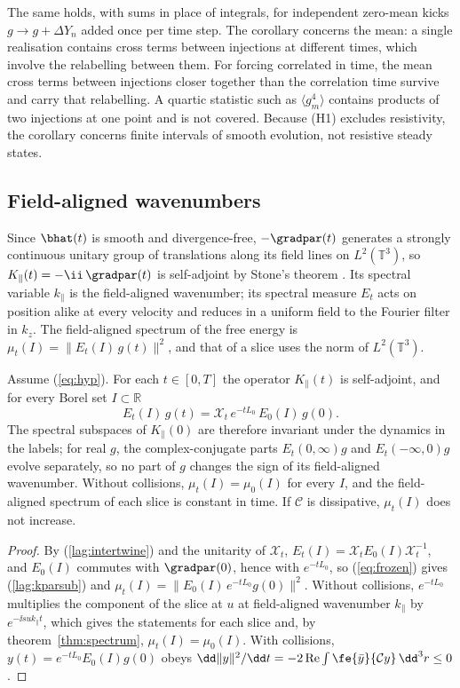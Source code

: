 The same holds, with sums in place of integrals, for independent zero-mean kicks $g\to g+\Delta Y_n$ added once per time step. The corollary concerns the mean: a single realisation contains cross terms between injections at different times, which involve the relabelling between them. For forcing correlated in time, the mean cross terms between injections closer together than the correlation time survive and carry that relabelling. A quartic statistic such as $\langle g_m^4\rangle$ contains products of two injections at one point and is not covered. Because (H1) excludes resistivity, the corollary concerns finite intervals of smooth evolution, not resistive steady states.

\subsection{Field-aligned wavenumbers}

Since $\bhat(t)$ is smooth and divergence-free, $-\gradpar(t)$ generates a strongly continuous unitary group of translations along its field lines on $L^2(\mathbb T^3)$, so $K_\parallel(t)=-\ii\,\gradpar(t)$ is self-adjoint by Stone's theorem \citep[e.g.][]{Kato1966}. Its spectral variable $k_\parallel$ is the field-aligned wavenumber; its spectral measure $E_t$ acts on position alike at every velocity and reduces in a uniform field to the Fourier filter in $k_z$. The field-aligned spectrum of the free energy is $\mu_t(I)=\|E_t(I)\,g(t)\|^2$, and that of a slice uses the norm of $L^2(\mathbb T^3)$.

\begin{corollary}\label{cor:kpar}
Assume (\ref{eq:hyp}). For each $t\in[0,T]$ the operator $K_\parallel(t)$ is self-adjoint, and for every Borel set $I\subset\mathbb R$
\begin{equation}\label{lag:kparsub}
  E_t(I)\,g(t)=\mathcal X_t\,e^{-tL_0}\,E_0(I)\,g(0) .
\end{equation}
The spectral subspaces of $K_\parallel(0)$ are therefore invariant under the dynamics in the labels; for real $g$, the complex-conjugate parts $E_t(0,\infty)g$ and $E_t(-\infty,0)g$ evolve separately, so no part of $g$ changes the sign of its field-aligned wavenumber. Without collisions, $\mu_t(I)=\mu_0(I)$ for every $I$, and the field-aligned spectrum of each slice is constant in time. If $\mathcal C$ is dissipative, $\mu_t(I)$ does not increase.
\end{corollary}

\begin{proof}
By (\ref{lag:intertwine}) and the unitarity of $\mathcal X_t$, $E_t(I)=\mathcal X_tE_0(I)\mathcal X_t^{-1}$, and $E_0(I)$ commutes with $\gradpar(0)$, hence with $e^{-tL_0}$, so (\ref{eq:frozen}) gives (\ref{lag:kparsub}) and $\mu_t(I)=\|E_0(I)\,e^{-tL_0}g(0)\|^2$. Without collisions, $e^{-tL_0}$ multiplies the component of the slice at $u$ at field-aligned wavenumber $k_\parallel$ by $e^{-\ii suk_\parallel t}$, which gives the statements for each slice and, by theorem~\ref{thm:spectrum}, $\mu_t(I)=\mu_0(I)$. With collisions, $y(t)=e^{-tL_0}E_0(I)g(0)$ obeys $\dd\|y\|^2/\dd t=-2\,\mathrm{Re}\int\fe{\bar y}{\mathcal Cy}\,\dd^3r\le0$.
\end{proof}

